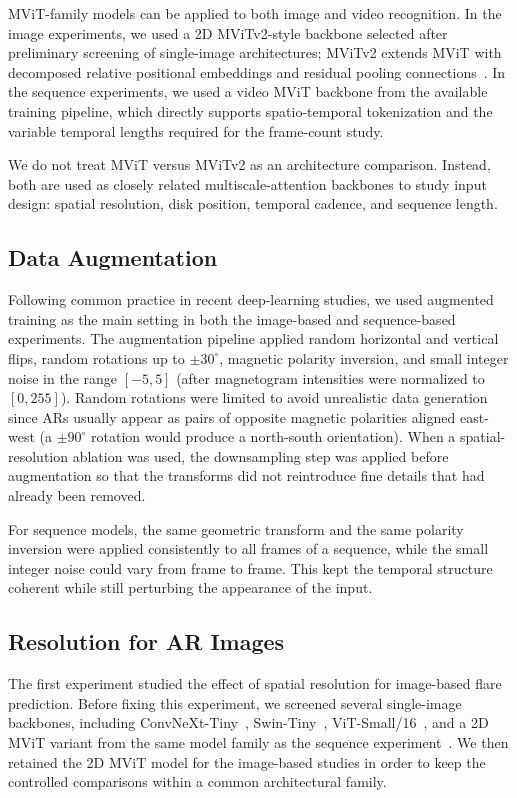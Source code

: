 \documentclass[runningheads]{llncs}
\begin{document}
MViT-family models can be applied to both image and video recognition. In the image experiments, we used a 2D MViTv2-style backbone selected after preliminary screening of single-image architectures; MViTv2 extends MViT with decomposed relative positional embeddings and residual pooling connections~\cite{ref_mvitv2}. In the sequence experiments, we used a video MViT backbone from the available training pipeline, which directly supports spatio-temporal tokenization and the variable temporal lengths required for the frame-count study.

We do not treat MViT versus MViTv2 as an architecture comparison. Instead, both are used as closely related multiscale-attention backbones to study input design: spatial resolution, disk position, temporal cadence, and sequence length.


\subsection{Data Augmentation}

Following common practice in recent deep-learning studies, we used augmented training as the main setting in both the image-based and sequence-based experiments. The augmentation pipeline applied random horizontal and vertical flips, random rotations up to $\pm 30^\circ$, magnetic polarity inversion, and small integer noise in the range $[-5,5]$ (after magnetogram intensities were normalized to $[0,255]$). Random rotations were limited to avoid unrealistic data generation since ARs usually appear as pairs of opposite magnetic polarities aligned east-west (a $\pm90^\circ$ rotation would produce a north-south orientation). When a spatial-resolution ablation was used, the downsampling step was applied before augmentation so that the transforms did not reintroduce fine details that had already been removed.

For sequence models, the same geometric transform and the same polarity inversion were applied consistently to all frames of a sequence, while the small integer noise could vary from frame to frame. This kept the temporal structure coherent while still perturbing the appearance of the input.



\subsection{Resolution for AR Images}

The first experiment studied the effect of spatial resolution for image-based flare prediction. Before fixing this experiment, we screened several single-image backbones, including ConvNeXt-Tiny~\cite{ref_convnext}, Swin-Tiny~\cite{ref_swin}, ViT-Small/16~\cite{ref_vit}, and a 2D MViT variant from the same model family as the sequence experiment~\cite{ref_mvit}. We then retained the 2D MViT model for the image-based studies in order to keep the controlled comparisons within a common architectural family.
\end{document}
